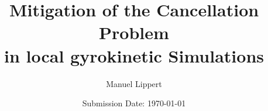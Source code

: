 \titlehead{
    \centering
    \texttt{[image: Uni\_Logo\_white\_black.png]}
}

\subject{\normalfont Master Thesis}
\title{Mitigation of the Cancellation Problem \\ in local gyrokinetic Simulations}
\author{Manuel Lippert}
\date{Submission Date: \today}
\publishers{\textbf{Physics Department at the University of Bayreuth}\\
\vspace*{2em}
Supervisors:\\
Prof.\,Arthur\,G.\,Peeters\\
Dr.\,Florian\,Rath
}

